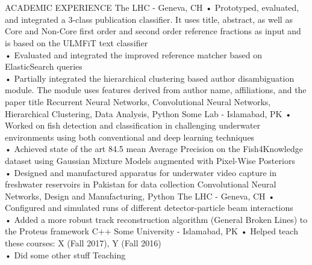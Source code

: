 \documentclass{my_cv}
\begin{document}
\section{\faLaptop}{ACADEMIC EXPERIENCE}
        {The LHC - Geneva, CH}
        {
            • Prototyped, evaluated, and integrated a 3-class publication classifier. It uses title, abstract, as well as Core and Non-Core first order and second order reference fractions as input and is based on the ULMFiT text classifier
            \\ \vspace{2pt}
            • Evaluated and integrated the improved reference matcher based on ElasticSearch queries
            \\ \vspace{2pt}
            • Partially integrated the hierarchical clustering based author disambiguation module. The module uses features derived from author name, affiliations, and the paper title
        }
        {Recurrent Neural Networks, Convolutional Neural Networks, Hierarchical Clustering, Data Analysis, Python}
        {Some Lab - Islamabad, PK}
        {
            • Worked on fish detection and classification in challenging underwater environments using both conventional and deep learning techniques
            \\ \vspace{2pt}
            • Achieved state of the art 84.5 mean Average Precision on the Fish4Knowledge dataset using Gaussian Mixture Models augmented with Pixel-Wise Posteriors
            \\ \vspace{2pt}
            • Designed and manufactured apparatus for underwater video capture in freshwater reservoirs in Pakistan for data collection
        }
        {Convolutional Neural Networks, Design and Manufacturing, Python}
        {The LHC - Geneva, CH}
        {
            • Configured and simulated runs of different detector-particle beam interactions
            \\ \vspace{2pt}
            • Added a more robust track reconstruction algorithm (General Broken Lines) to the Proteus framework}
        {C++}
        {Some University - Islamabad, PK}
        {
            • Helped teach these courses: X (Fall 2017), Y (Fall 2016)
            \\ \vspace{2pt}
            • Did some other stuff
        }
        {Teaching}
\end{document}
